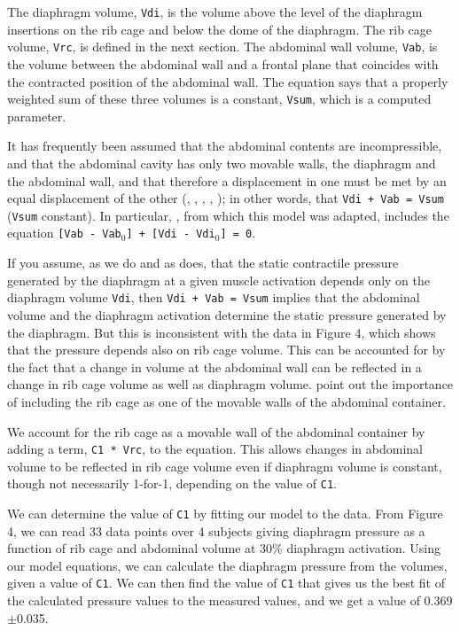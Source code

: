 \documentclass[12pt,openany,oneside]{book}
\newcommand{\ticode}[1]{\texttt{#1}}
\begin{document}
The diaphragm volume, \ticode{Vdi}, is the volume above the level of
the diaphragm insertions on the rib cage and below the dome of the
diaphragm. The rib cage volume, \ticode{Vrc}, is defined in the next
section. The abdominal wall volume, \ticode{Vab}, is the volume
between the abdominal wall and a frontal plane that coincides with the
contracted position of the abdominal wall. The equation says that a
properly weighted sum of these three volumes is a constant,
\ticode{Vsum}, which is a computed parameter.

It has frequently been assumed that the abdominal contents are
incompressible, and that the abdominal cavity has only two movable
walls, the diaphragm and the abdominal wall, and that therefore a
displacement in one must be met by an equal displacement of the other
(\citet{Mead01091982}, \citet{Grassino01061978},
\citet{Grimby01111976}, \cite{Macklem01021978},
\citet{Lichtenstein01021992}); in other words, that
\ticode{Vdi + Vab = Vsum} (\ticode{Vsum} constant). In particular,
\citet{Lichtenstein01021992}, from which this model was adapted,
includes the equation \ticode{[Vab - Vab$_0$] + [Vdi - Vdi$_0$] = 0}.

If you assume, as we do and as \citet{Lichtenstein01021992} does, that
the static contractile pressure generated by the diaphragm at a given
muscle activation depends only on the diaphragm volume \ticode{Vdi},
then \ticode{Vdi + Vab = Vsum} implies that the abdominal volume and
the diaphragm activation determine the static pressure generated by
the diaphragm. But this is inconsistent with the data in
\citet{Grassino01061978} Figure 4, which shows that the pressure
depends also on rib cage volume. This can be accounted for by the
fact that a change in volume at the abdominal wall can be reflected in
a change in rib cage volume as well as diaphragm volume.
\citet{Mead01091982} point out the importance of including the rib
cage as one of the movable walls of the abdominal container.

We account for the rib cage as a movable wall of the abdominal
container by adding a term, \ticode{C1 * Vrc}, to the equation. This
allows changes in abdominal volume to be reflected in rib cage volume
even if diaphragm volume is constant, though not necessarily 1-for-1,
depending on the value of \ticode{C1}.

We can determine the value of \ticode{C1} by fitting our model to the
data. From \citet{Grassino01061978} Figure 4, we can read 33 data
points over 4 subjects giving diaphragm pressure as a function of rib
cage and abdominal volume at 30\% diaphragm activation. Using our
model equations, we can calculate the diaphragm pressure from the
volumes, given a value of \ticode{C1}. We can then find the value of
\ticode{C1} that gives us the best fit of the calculated pressure
values to the measured values, and we get a value of 0.369$\pm$0.035.
\end{document}
